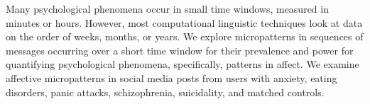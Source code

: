 Many psychological phenomena occur in small time windows, measured in minutes or hours. However, most computational linguistic techniques look at data on the order of weeks, months, or years. We explore micropatterns in sequences of messages occurring over a short time window for their prevalence and power for quantifying psychological phenomena, specifically, patterns in affect. We examine affective micropatterns in social media posts from users with anxiety, eating disorders, panic attacks, schizophrenia, suicidality, and matched controls.
